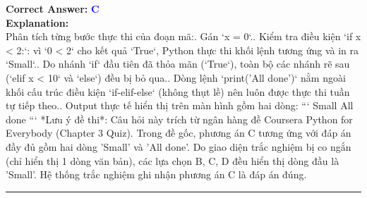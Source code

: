 \documentclass[11pt,a4paper]{article}
\begin{document}
\begin{minipage}{\textwidth}
\noindent \textbf{Correct Answer:} \textcolor{blue}{\textbf{C}} \\[4pt]
\noindent \textbf{Explanation:}\\
Phân tích từng bước thực thi của đoạn mã:. Gán `x = 0`.. Kiểm tra điều kiện `if x < 2:`: vì `0 < 2` cho kết quả `True`, Python thực thi khối lệnh tương ứng và in ra `Small`.. Do nhánh `if` đầu tiên đã thỏa mãn (`True`), toàn bộ các nhánh rẽ sau (`elif x < 10` và `else`) đều bị bỏ qua.. Dòng lệnh `print('All done')` nằm ngoài khối cấu trúc điều kiện `if-elif-else` (không thụt lề) nên luôn được thực thi tuần tự tiếp theo.. Output thực tế hiển thị trên màn hình gồm hai dòng:\newline
```\newline
Small\newline
All done\newline
```\newline
*Lưu ý đề thi*: Câu hỏi này trích từ ngân hàng đề Coursera Python for Everybody (Chapter 3 Quiz). Trong đề gốc, phương án C tương ứng với đáp án đầy đủ gồm hai dòng 'Small' và 'All done'. Do giao diện trắc nghiệm bị co ngắn (chỉ hiển thị 1 dòng văn bản), các lựa chọn B, C, D đều hiển thị dòng đầu là 'Small'. Hệ thống trắc nghiệm ghi nhận phương án C là đáp án đúng.
\end{minipage}
\vspace{0.8cm}
\hrule
\vspace{0.5cm}
\end{document}
